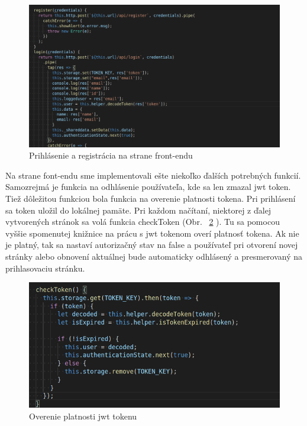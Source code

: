 \begin{figure}[H]
    \centering
    \includegraphics[scale=0.40]{img/imp/login_front.png}
    \caption{Prihlásenie a registrácia na strane front-endu}
    \label{fig:login_front}
\end{figure}

\indent Na strane font-endu sme implementovali ešte niekoľko ďalších potrebných funkcií. Samozrejmá je funkcia na odhlásenie používateľa, kde sa len zmazal jwt token. Tiež dôležitou funkciou bola funkcia na overenie platnosti tokena. Pri prihlásení sa token uložil do lokálnej pamäte. Pri každom načítaní, niektorej z ďalej vytvorených stránok sa volá funkcia checkToken (Obr. ~\ref{fig:checkjwt} ). Tu sa pomocou vyššie spomenutej knižnice na prácu s jwt tokenom overí platnosť tokena. Ak nie je platný, tak sa nastaví autorizačný stav na false a používateľ pri otvorení novej stránky alebo obnovení aktuálnej bude automaticky odhlásený a presmerovaný na prihlasovaciu stránku. 

\begin{figure}[H]
    \centering
    \includegraphics[scale=0.50]{img/imp/checkjwt.png}
    \caption{Overenie platnosti jwt tokenu}
    \label{fig:checkjwt}
\end{figure}

